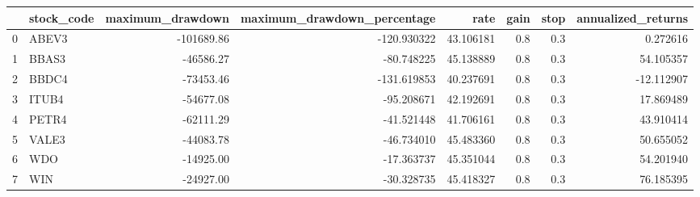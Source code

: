 \begin{tabular}{llrrrrrr}
\toprule
{} & stock\_code &  maximum\_drawdown &  maximum\_drawdown\_percentage &       rate &  gain &  stop &  annualized\_returns \\
\midrule
0 &      ABEV3 &        -101689.86 &                  -120.930322 &  43.106181 &   0.8 &   0.3 &            0.272616 \\
1 &      BBAS3 &         -46586.27 &                   -80.748225 &  45.138889 &   0.8 &   0.3 &           54.105357 \\
2 &      BBDC4 &         -73453.46 &                  -131.619853 &  40.237691 &   0.8 &   0.3 &          -12.112907 \\
3 &      ITUB4 &         -54677.08 &                   -95.208671 &  42.192691 &   0.8 &   0.3 &           17.869489 \\
4 &      PETR4 &         -62111.29 &                   -41.521448 &  41.706161 &   0.8 &   0.3 &           43.910414 \\
5 &      VALE3 &         -44083.78 &                   -46.734010 &  45.483360 &   0.8 &   0.3 &           50.655052 \\
6 &        WDO &         -14925.00 &                   -17.363737 &  45.351044 &   0.8 &   0.3 &           54.201940 \\
7 &        WIN &         -24927.00 &                   -30.328735 &  45.418327 &   0.8 &   0.3 &           76.185395 \\
\bottomrule
\end{tabular}
